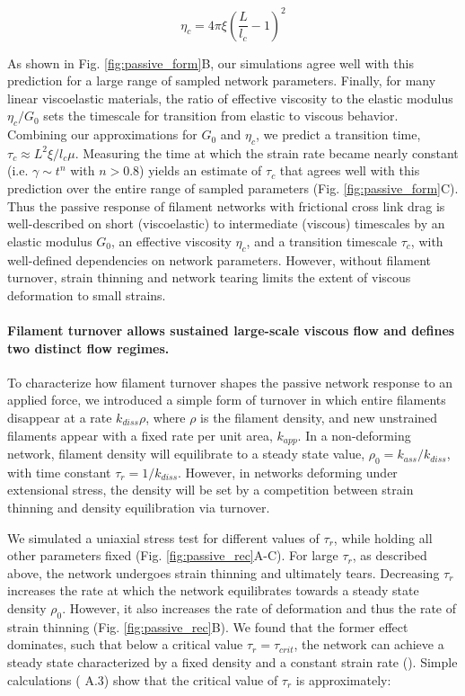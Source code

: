 \begin{equation}
	\eta_c = 4\pi\xi\left ( \frac{L}{l_c}-1\right )^2
\end{equation}


As shown in Fig. \ref{fig:passive_form}B, our simulations agree well with this prediction for a large range of sampled network parameters. Finally, for many linear viscoelastic materials, the ratio of effective viscosity to the elastic modulus $\eta_c/G_0$ sets the timescale for transition from elastic to viscous behavior\cite{mccrum1997principles}. Combining our approximations for $G_0$ and $\eta_c$, we predict a transition time, $\tau_c \approx L^2\xi/l_c\mu$. Measuring the time at which the strain rate became nearly constant (i.e. $\gamma \sim t^n$ with $n>0.8$) yields an estimate of $\tau_c$ that agrees well with this prediction over the entire range of sampled parameters (Fig. \ref{fig:passive_form}C).  Thus the passive response of filament networks with frictional cross link drag is well-described on short (viscoelastic) to intermediate (viscous) timescales by an elastic modulus $G_0$, an effective viscosity $\eta_c$, and a transition timescale $\tau_c$, with well-defined dependencies on network parameters. However, without filament turnover, strain thinning and network tearing limits the extent of viscous deformation to small strains.

\paragraph{Filament turnover allows sustained large-scale viscous flow and defines two distinct flow regimes.} 


To characterize how filament turnover shapes the passive network response to an applied force, we introduced a simple form of turnover in which entire filaments disappear at a rate $k_{diss}\rho$, where $\rho$ is the filament density, and new unstrained filaments appear with a fixed rate per unit area, $k_{app}$. In a non-deforming network,  filament density will equilibrate to a steady state value, $\rho_0 = k_{ass}/k_{diss}$, with time constant $\tau_r = 1/k_{diss}$.  However, in networks deforming under extensional stress, the density will be set by a competition between strain thinning and density equilibration via turnover. 

We simulated a uniaxial stress test for different values of $\tau_r$, while holding all other parameters fixed (Fig. \ref{fig:passive_rec}A-C). For large $\tau_r$, as described above, the network undergoes strain thinning and ultimately tears.  Decreasing $\tau_r$ increases the rate at which the network equilibrates towards a steady state density $\rho_0$.  However, it also increases the rate of deformation and thus the rate of strain thinning (Fig. \ref{fig:passive_rec}B).  We found that the former effect dominates, such that below a critical value $\tau_r = \tau_{crit}$, the network can achieve a steady state characterized by a fixed density and a constant strain rate ().  Simple calculations ( A.3) show that the critical value of $\tau_r$ is approximately:

